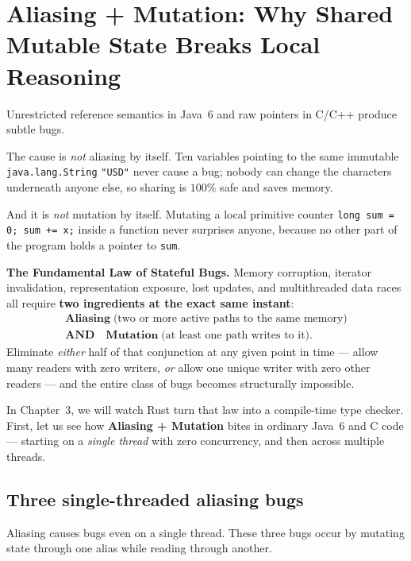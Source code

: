 \section{Aliasing + Mutation: Why Shared Mutable State Breaks Local Reasoning}
\label{ch01:aliasing-and-mutation}

Unrestricted reference semantics in Java~6 and raw pointers in C/C++ produce subtle bugs.

The cause is \emph{not} aliasing by itself. Ten variables pointing to the same immutable \texttt{java.lang.String} \texttt{"USD"} never cause a bug; nobody can change the characters underneath anyone else, so sharing is $100\%$ safe and saves memory.

And it is \emph{not} mutation by itself. Mutating a local primitive counter \texttt{long sum = 0; sum += x;} inside a function never surprises anyone, because no other part of the program holds a pointer to \texttt{sum}.

\begin{focusbox}
\textbf{The Fundamental Law of Stateful Bugs.}
Memory corruption, iterator invalidation, representation exposure, lost updates, and multithreaded data races all require \textbf{two ingredients at the exact same instant}:
\begin{gather*}
\textbf{Aliasing} \;\text{(two or more active paths to the same memory)} \\
\textbf{AND}\quad
\textbf{Mutation} \;\text{(at least one path writes to it)}.
\end{gather*}
Eliminate \emph{either} half of that conjunction at any given point in time --- allow many readers with zero writers, \emph{or} allow one unique writer with zero other readers --- and the entire class of bugs becomes structurally impossible.
\end{focusbox}

In Chapter~3, we will watch Rust turn that law into a compile-time type checker. First, let us see how \textbf{Aliasing + Mutation} bites in ordinary Java~6 and C code --- starting on a \emph{single thread} with zero concurrency, and then across multiple threads.

\subsection{Three single-threaded aliasing bugs}

Aliasing causes bugs even on a single thread. These three bugs occur by mutating state through one alias while reading through another.


